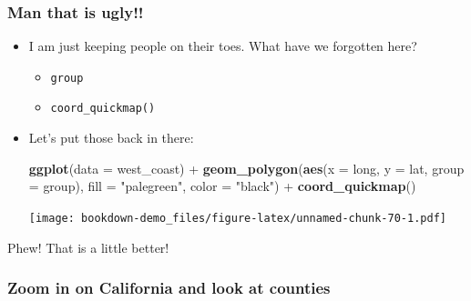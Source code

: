 \documentclass[]{book}
\newenvironment{Shaded}{\begin{snugshade}}{\end{snugshade}}
\newcommand{\KeywordTok}[1]{\textcolor[rgb]{0.13,0.29,0.53}{\textbf{{#1}}}}
\newcommand{\DataTypeTok}[1]{\textcolor[rgb]{0.13,0.29,0.53}{{#1}}}
\newcommand{\StringTok}[1]{\textcolor[rgb]{0.31,0.60,0.02}{{#1}}}
\newcommand{\NormalTok}[1]{{#1}}
\providecommand{\tightlist}{%
  \setlength{\itemsep}{0pt}\setlength{\parskip}{0pt}}
\theoremstyle{definition}
\theoremstyle{definition}
\theoremstyle{remark}
\begin{document}
\subsubsection{Man that is ugly!!}\label{man-that-is-ugly}

\begin{itemize}
\item
  I am just keeping people on their toes. What have we forgotten here?

  \begin{itemize}
  \tightlist
  \item
    \texttt{group}
  \item
    \texttt{coord\_quickmap()}
  \end{itemize}
\item
  Let's put those back in there:

\begin{Shaded}
\begin{Highlighting}[]
\KeywordTok{ggplot}\NormalTok{(}\DataTypeTok{data =} \NormalTok{west_coast) +}\StringTok{ }
\StringTok{  }\KeywordTok{geom_polygon}\NormalTok{(}\KeywordTok{aes}\NormalTok{(}\DataTypeTok{x =} \NormalTok{long, }\DataTypeTok{y =} \NormalTok{lat, }\DataTypeTok{group =} \NormalTok{group), }\DataTypeTok{fill =} \StringTok{"palegreen"}\NormalTok{, }\DataTypeTok{color =} \StringTok{"black"}\NormalTok{) +}\StringTok{ }
\StringTok{  }\KeywordTok{coord_quickmap}\NormalTok{()}
\end{Highlighting}
\end{Shaded}

  \texttt{[image: bookdown-demo\_files/figure-latex/unnamed-chunk-70-1.pdf]}
\end{itemize}

Phew! That is a little better!

\subsubsection{Zoom in on California and look at
counties}\label{zoom-in-on-california-and-look-at-counties}
\end{document}
